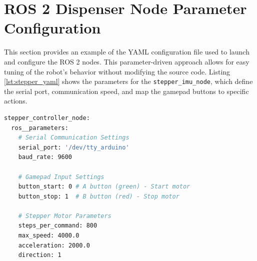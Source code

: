 \section{ROS 2 Dispenser Node Parameter Configuration}
\label{sec:appendix_yaml}
This section provides an example of the YAML configuration file used to launch and configure the ROS 2 nodes. This parameter-driven approach allows for easy tuning of the robot's behavior without modifying the source code. Listing \ref{lst:stepper_yaml} shows the parameters for the \texttt{stepper\_imu\_node}, which define the serial port, communication speed, and map the gamepad buttons to specific actions.


\begin{lstlisting}[language=bash, caption={YAML parameter file for the dispenser node (\texttt{stepper\_config.yaml}).}, label={lst:stepper_yaml}]
stepper_controller_node:
  ros__parameters:
    # Serial Communication Settings
    serial_port: '/dev/tty_arduino'
    baud_rate: 9600
    
    # Gamepad Input Settings  
    button_start: 0 # A button (green) - Start motor
    button_stop: 1  # B button (red) - Stop motor
    
    # Stepper Motor Parameters
    steps_per_command: 800
    max_speed: 4000.0
    acceleration: 2000.0
    direction: 1
\end{lstlisting}